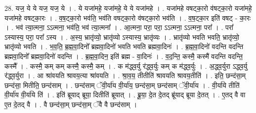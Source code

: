 \documentclass[17pt]{extarticle}
\begin{document}
28. यज॒ ये ये यज॒ यज॒ ये । . ये यजा॑महे॒ यजा॑महे॒ ये ये यजा॑महे । . यजा॑महे वषट्का॒रो व॑षट्का॒रो यजा॑महे॒ यजा॑महे वषट्का॒रः । . व॒ष॒ट्का॒रो भव॑ति॒ भव॑ति वषट्का॒रो व॑षट्का॒रो भव॑ति । . व॒ष॒ट्का॒र इति॑ वषट् - का॒रः । . भव॑ त्या॒त्मना॒ ऽऽत्मना॒ भव॑ति॒ भव॑ त्या॒त्मना᳚ । . आ॒त्मना॒ परा॒ परा॒ ऽऽत्मना॒ ऽऽत्मना॒ परा᳚ । . परा᳚ ऽस्यास्य॒ परा॒ परा᳚ ऽस्य । . अ॒स्य॒ भ्रातृ॑व्यो॒ भ्रातृ॑व्यो ऽस्यास्य॒ भ्रातृ॑व्यः । . भ्रातृ॑व्यो भवति भवति॒ भ्रातृ॑व्यो॒ भ्रातृ॑व्यो भवति । . भ॒व॒ति॒ ब्र॒ह्म॒वा॒दिनो᳚ ब्रह्मवा॒दिनो॑ भवति भवति ब्रह्मवा॒दिनः॑ । . ब्र॒ह्म॒वा॒दिनो॑ वदन्ति वदन्ति ब्रह्मवा॒दिनो᳚ ब्रह्मवा॒दिनो॑ वदन्ति । . ब्र॒ह्म॒वा॒दिन॒ इति॑ ब्रह्म - वा॒दिनः॑ । . व॒द॒न्ति॒ कस्मै॒ कस्मै॑ वदन्ति वदन्ति॒ कस्मै᳚ । . कस्मै॒ कम् कम् कस्मै॒ कस्मै॒ कम् । . क म॑द्ध्व॒र्यु र॑द्ध्व॒र्युः कम् क म॑द्ध्व॒र्युः । . अ॒द्ध्व॒र्युरा ऽद्ध्व॒र्यु र॑द्ध्व॒र्युरा । . आ श्रा॑वयति श्रावय॒त्या श्रा॑वयति । . श्रा॒व॒य॒ तीतीति॑ श्रावयति श्रावय॒तीति॑ । . इति॒ छन्द॑सा॒म् छन्द॑सा॒ मितीति॒ छन्द॑साम् । . छन्द॑साम् ॅवी॒र्या॑य वी॒र्या॑य॒ छन्द॑सा॒म् छन्द॑साम् ॅवी॒र्या॑य । . वी॒र्या॑ये तीति॑ वी॒र्या॑य वी॒र्या॑ये ति॑ । . इति॑ ब्रूयाद् ब्रूया॒ दितीति॑ ब्रूयात् । . ब्रू॒या॒ दे॒त दे॒तद् ब्रू॑याद् ब्रूया दे॒तत् । . ए॒तद् वै वा ए॒त दे॒तद् वै । . वै छन्द॑सा॒म् छन्द॑सा॒म् ॅवै वै छन्द॑साम् । \newline
\end{document}
